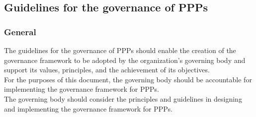 \documentclass[letterpaper,10pt,english]{jupyterBook}
\begin{document}
\subsection{Guidelines for the governance of PPPs}
\label{\detokenize{PM/ppm:guidelines-for-the-governance-of-ppps}}

\subsubsection{General}
\label{\detokenize{PM/ppm:id1}}
\sphinxAtStartPar
The guidelines for the governance of PPPs should enable the creation of the governance framework to be adopted by the organization’s governing body and support its values, principles, and the achievement of its objectives. \\
For the purposes of this document, the governing body should be accountable for implementing the governance framework for PPPs. \\
The governing body should consider the principles and guidelines in designing and implementing the governance framework for PPPs.
\end{document}
